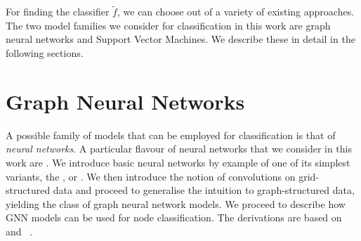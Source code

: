 \documentclass[
	fontsize=10pt, %
	twoside=true, %
	secnumdepth=1, %
  toc=indentunnumbered %
]{kaobook}
\begin{document}
For finding the classifier $\tilde f$, we can choose out of a variety of
existing approaches. The two model families we consider for classification in
this work are graph neural networks and Support Vector Machines. We describe
these in detail in the following sections.






\section{Graph Neural Networks}%
\label{sec:neural-networks}



A possible family of models that can be employed for classification is that of
\textit{neural networks}. A particular flavour of neural networks that we
consider in this work are . We introduce basic neural
networks by example of one of its simplest variants, the , or . We then
introduce the notion of convolutions on grid-structured data and proceed to
generalise the intuition to graph-structured data, yielding the class of graph
neural network models. We proceed to describe how GNN models can be used for
node classification. The derivations are based on \citeauthor{zhang_dive_nodate}~\cite{zhang_dive_nodate} and \citeauthor{bronstein_geometric_2021}~\cite{bronstein_geometric_2021}.
\end{document}

